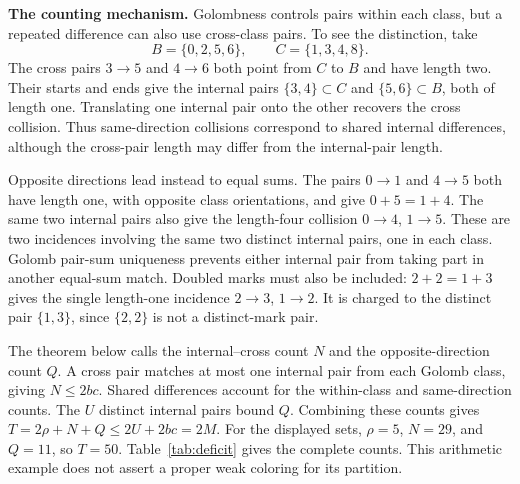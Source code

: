 \documentclass[11pt,a4paper]{article}
\newif\ifshowrevisions
\newenvironment{revision}{\par\begingroup\ifshowrevisions\color{red}\fi}{\par\endgroup}
\theoremstyle{definition}
\numberwithin{equation}{section}
\begin{document}
\begin{revision}
\medskip\noindent\textbf{The counting mechanism.}
Golombness controls pairs within each class, but a repeated difference can
also use cross-class pairs. To see the distinction, take
\[
B=\{0,2,5,6\},\qquad C=\{1,3,4,8\}.
\]
The cross pairs $3\to5$ and $4\to6$ both point from $C$ to $B$ and
have length two. Their starts and ends give the internal pairs
$\{3,4\}\subset C$ and $\{5,6\}\subset B$, both of length one.
Translating one internal pair onto the other recovers the cross collision.
Thus same-direction collisions correspond to shared internal differences,
although the cross-pair length may differ from the internal-pair length.

Opposite directions lead instead to equal sums. The pairs $0\to1$ and
$4\to5$ both have length one, with opposite class orientations, and give
$0+5=1+4$. The same two internal pairs also give the length-four
collision $0\to4$, $1\to5$. These are two incidences involving the same two distinct internal pairs,
one in each class. Golomb pair-sum uniqueness prevents either internal pair
from taking part in another equal-sum match.
Doubled marks must also be included: $2+2=1+3$ gives the single
length-one incidence $2\to3$, $1\to2$. It is charged to the distinct
pair $\{1,3\}$, since $\{2,2\}$ is not a distinct-mark pair.

The theorem below calls the internal--cross count $N$ and the
opposite-direction count $Q$. A cross pair matches at most one internal
pair from each Golomb class, giving $N\le2bc$. Shared differences account for the within-class and same-direction counts.
The $U$ distinct internal pairs bound $Q$. Combining these counts gives
$T=2\rho+N+Q\le2U+2bc=2M$.
For the displayed sets, $\rho=5$, $N=29$, and $Q=11$, so $T=50$.
Table~\ref{tab:deficit} gives the complete counts.
This arithmetic example does not assert a proper weak coloring for its
partition.
\end{revision}
\end{document}
